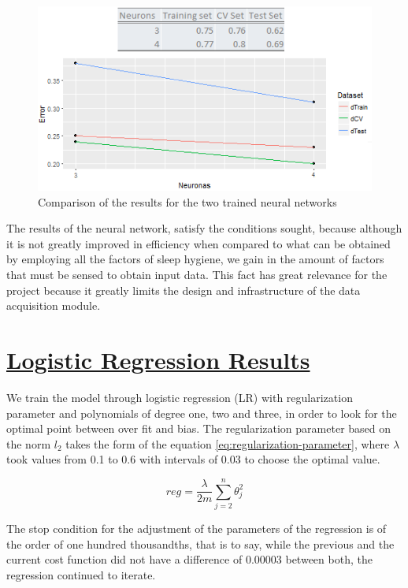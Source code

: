 \documentclass[]{book}
\begin{document}
\begin{figure}[H]

{\centering \includegraphics[width=0.8\linewidth]{images/results-of-the-3-4-nn} 

}

\caption{Comparison of the results for the two trained neural networks}\label{fig:results-of-the-3-4-nn}
\end{figure}

The results of the neural network, satisfy the conditions sought,
because although it is not greatly improved in efficiency when compared
to what can be obtained by employing all the factors of sleep hygiene,
we gain in the amount of factors that must be sensed to obtain input
data. This fact has great relevance for the project because it greatly
limits the design and infrastructure of the data acquisition module.

\section{\texorpdfstring{\protect\hyperlink{LR-results}{Logistic
Regression
Results}}{Logistic Regression Results}}\label{logistic-regression-results}

We train the model through logistic regression (LR) with regularization
parameter and polynomials of degree one, two and three, in order to look
for the optimal point between over fit and bias. The regularization
parameter based on the norm \(l_2\) takes the form of the equation
\eqref{eq:regularization-parameter}, where \(\lambda\) took values from
0.1 to 0.6 with intervals of 0.03 to choose the optimal value.

\begin{equation}
  reg=\frac{\lambda}{2m}\sum_{j=2}^{n}\theta_j^2
  \label{eq:regularization-parameter}
\end{equation}

The stop condition for the adjustment of the parameters of the
regression is of the order of one hundred thousandths, that is to say,
while the previous and the current cost function did not have a
difference of 0.00003 between both, the regression continued to iterate.
\end{document}
